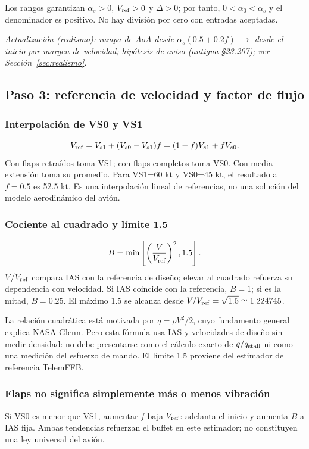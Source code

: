 \documentclass[11pt,a4paper]{article}
\begin{document}
Los rangos garantizan $\alpha_s>0$, $V_{\rm ref}>0$ y $\Delta>0$; por tanto, $0<\alpha_0<\alpha_s$ y el denominador es positivo. No hay división por cero con entradas aceptadas.

\textit{Actualización (realismo): rampa de AoA desde $\alpha_s(0.5+0.2f)$ $\rightarrow$ desde el inicio por margen de velocidad; hipótesis de aviso (antigua §23.207); ver Sección~\ref{sec:realismo}.}

\subsection{Paso 3: referencia de velocidad y factor de flujo}
\subsubsection{Interpolación de VS0 y VS1}
\begin{equation}
V_{\rm ref}=V_{s1}+(V_{s0}-V_{s1})f
=(1-f)V_{s1}+fV_{s0}.
\label{eq:stall-vref}
\end{equation}
Con flaps retraídos toma VS1; con flaps completos toma VS0. Con media extensión toma su promedio. Para VS1=60 kt y VS0=45 kt, el resultado a $f=0.5$ es 52.5 kt. Es una interpolación lineal de referencias, no una solución del modelo aerodinámico del avión.

\subsubsection{Cociente al cuadrado y límite 1.5}
\begin{equation}
B=\min\left[\left(\frac{V}{V_{\rm ref}}\right)^2,1.5\right].
\label{eq:stall-flow}
\end{equation}
$V/V_{\rm ref}$ compara IAS con la referencia de diseño; elevar al cuadrado refuerza su dependencia con velocidad. Si IAS coincide con la referencia, $B=1$; si es la mitad, $B=0.25$. El máximo 1.5 se alcanza desde $V/V_{\rm ref}=\sqrt{1.5}\simeq1.224745$.

La relación cuadrática está motivada por $q=\rho V^2/2$, cuyo fundamento general explica \href{https://www1.grc.nasa.gov/beginners-guide-to-aeronautics/dynamic-pressure-2/}{NASA Glenn}. Pero esta fórmula usa IAS y velocidades de diseño sin medir densidad: no debe presentarse como el cálculo exacto de $q/q_{\rm stall}$ ni como una medición del esfuerzo de mando. El límite 1.5 proviene del estimador de referencia TelemFFB.

\subsubsection{Flaps no significa simplemente más o menos vibración}
Si VS0 es menor que VS1, aumentar $f$ baja $V_{\rm ref}$: adelanta el inicio y aumenta $B$ a IAS fija. Ambas tendencias refuerzan el buffet en este estimador; no constituyen una ley universal del avión.
\end{document}
